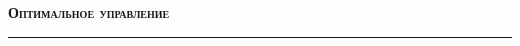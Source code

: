 \documentclass[12pt]{article}
\theoremstyle{example}
\theoremstyle{plain}
\theoremstyle{definition}
\theoremstyle{remark}
\numberwithin{remark}{section}
\begin{document}
	
	\begin{center}
		\Huge \bf	
		\textsc{Оптимальное управление}
		\rule{\textwidth}{0.4pt}
	\end{center}
	\tableofcontents
	
	
	
	
	
	
	
	
	
	
	
	
	
\end{document}
